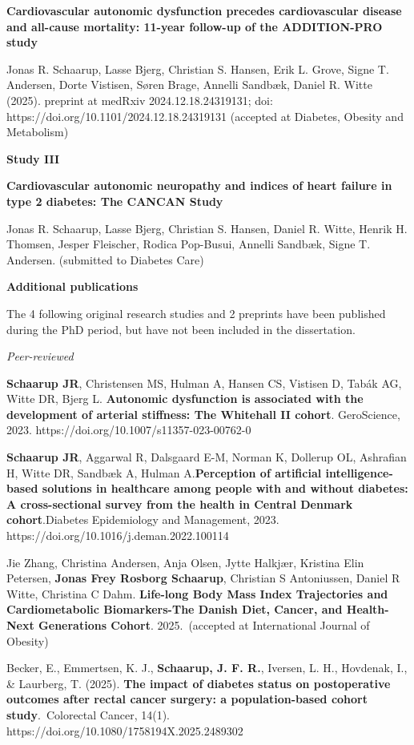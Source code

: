 \documentclass[
  letterpaper,
  headsepline=true,
  open=any]{scrbook}
\begin{document}
\textbf{Cardiovascular autonomic dysfunction precedes cardiovascular
disease and all-cause mortality: 11-year follow-up of the ADDITION-PRO
study}

Jonas R. Schaarup, Lasse Bjerg, Christian S. Hansen, Erik L. Grove,
Signe T. Andersen, Dorte Vistisen, Søren Brage, Annelli Sandbæk, Daniel
R. Witte (2025). preprint at medRxiv 2024.12.18.24319131; doi:
https://doi.org/10.1101/2024.12.18.24319131 (accepted at Diabetes,
Obesity and Metabolism)

\textbf{Study III}

\textbf{Cardiovascular autonomic neuropathy and indices of heart failure
in type 2 diabetes: The CANCAN Study}

Jonas R. Schaarup, Lasse Bjerg, Christian S. Hansen, Daniel R. Witte,
Henrik H. Thomsen, Jesper Fleischer, Rodica Pop-Busui, Annelli Sandbæk,
Signe T. Andersen. (submitted to Diabetes Care)

\newpage

\textbf{Additional publications}

The 4 following original research studies and 2 preprints have been
published during the PhD period, but have not been included in the
dissertation.

\emph{Peer-reviewed}

\textbf{Schaarup JR}, Christensen MS, Hulman A, Hansen CS, Vistisen D,
Tabák AG, Witte DR, Bjerg L. \textbf{Autonomic dysfunction is associated
with the development of arterial stiffness: The Whitehall II cohort}.
GeroScience, 2023. https://doi.org/10.1007/s11357-023-00762-0

\textbf{Schaarup JR}, Aggarwal R, Dalsgaard E-M, Norman K, Dollerup OL,
Ashrafian H, Witte DR, Sandbæk A, Hulman A.\textbf{Perception of
artificial intelligence-based solutions in healthcare among people with
and without diabetes: A cross-sectional survey from the health in
Central Denmark cohort}.Diabetes Epidemiology and Management, 2023.
https://doi.org/10.1016/j.deman.2022.100114

Jie Zhang, Christina Andersen, Anja Olsen, Jytte Halkjær, Kristina Elin
Petersen, \textbf{Jonas Frey Rosborg Schaarup}, Christian S Antoniussen,
Daniel R Witte, Christina C Dahm. \textbf{Life-long Body Mass Index
Trajectories and Cardiometabolic Biomarkers-The Danish Diet, Cancer, and
Health-Next Generations Cohort}. 2025.~(accepted at International
Journal of Obesity)

Becker, E., Emmertsen, K. J., \textbf{Schaarup, J. F. R.}, Iversen, L.
H., Hovdenak, I., \& Laurberg, T. (2025). \textbf{The impact of diabetes
status on postoperative outcomes after rectal cancer surgery: a
population-based cohort study}.~Colorectal Cancer, 14(1).
https://doi.org/10.1080/1758194X.2025.2489302
\end{document}
